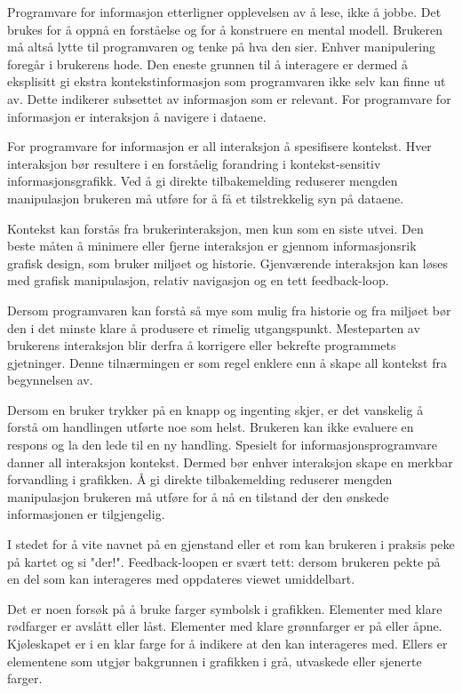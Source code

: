 Programvare for informasjon etterligner opplevelsen av å lese, ikke å jobbe. Det brukes for å oppnå en forståelse og for å konstruere en mental modell. Brukeren må altså lytte til programvaren og tenke på hva den sier. Enhver manipulering foregår i brukerens hode. Den eneste grunnen til å interagere er dermed å eksplisitt gi ekstra kontekstinformasjon som programvaren ikke selv kan finne ut av. Dette indikerer subsettet av informasjon som er relevant. For programvare for informasjon er interaksjon å navigere i dataene.

For programvare for informasjon er all interaksjon å spesifisere kontekst. Hver interaksjon bør resultere i en forståelig forandring i kontekst-sensitiv informasjonsgrafikk. Ved å gi direkte tilbakemelding reduserer mengden manipulasjon brukeren må utføre for å få et tilstrekkelig syn på dataene.

Kontekst kan forstås fra brukerinteraksjon, men kun som en siste utvei. Den beste måten å minimere eller fjerne interaksjon er gjennom informasjonsrik grafisk design, som bruker miljøet og historie. Gjenværende interaksjon kan løses med grafisk manipulasjon, relativ navigasjon og en tett feedback-loop.

Dersom programvaren kan forstå så mye som mulig fra historie og fra miljøet bør den i det minste klare å produsere et rimelig utgangspunkt. Mesteparten av brukerens interaksjon blir derfra å korrigere eller bekrefte programmets gjetninger. Denne tilnærmingen er som regel enklere enn å skape all kontekst fra begynnelsen av.

Dersom en bruker trykker på en knapp og ingenting skjer, er det vanskelig å forstå om handlingen utførte noe som helst. Brukeren kan ikke evaluere en respons og la den lede til en ny handling. Spesielt for informasjonsprogramvare danner all interaksjon kontekst. Dermed bør enhver interaksjon skape en merkbar forvandling i grafikken. Å gi direkte tilbakemelding reduserer mengden manipulasjon brukeren må utføre for å nå en tilstand der den ønskede informasjonen er tilgjengelig.

I stedet for å vite navnet på en gjenstand eller et rom kan brukeren i praksis peke på kartet og si "der!". Feedback-loopen er svært tett: dersom brukeren pekte på en del som kan interageres med oppdateres viewet umiddelbart. 

Det er noen forsøk på å bruke farger symbolsk i grafikken. Elementer med klare rødfarger er avslått eller låst. Elementer med klare grønnfarger er på eller åpne. Kjøleskapet er i en klar farge for å indikere at den kan interageres med. Ellers er elementene som utgjør bakgrunnen i grafikken i grå, utvaskede eller sjenerte farger.

